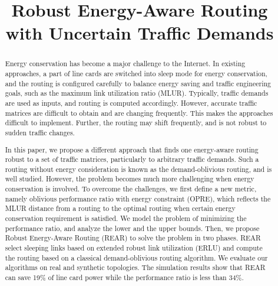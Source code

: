 \documentclass[conference]{IEEEtran}
\begin{document}
\title{Robust Energy-Aware Routing with Uncertain Traffic Demands}


\author{
\and
{}
\and
{}
}


\maketitle

\begin{abstract}
Energy conservation has become a major challenge to the Internet. In existing approaches, a part of line cards
are switched into sleep mode for energy conservation, and the routing is configured carefully to balance energy saving
and traffic engineering goals, such as the maximum link utilization ratio (MLUR). Typically, traffic demands are
used as inputs, and routing is computed accordingly. However, accurate traffic matrices are difficult to obtain and
are changing frequently. This makes the approaches difficult to implement. Further, the routing may shift
frequently, and is not robust to sudden traffic changes.

In this paper, we propose a different approach that finds one energy-aware routing robust to a set of traffic
matrices, particularly to arbitrary traffic demands. Such a routing without energy consideration is known as
the demand-oblivious routing, and is well studied. However, the problem becomes much more challenging when energy
conservation is involved. To overcome the challenges, we first define a new metric, namely oblivious performance
ratio with energy constraint (OPRE), which reflects the MLUR distance from a routing to the optimal routing when
certain energy conservation requirement is satisfied. We model the problem of minimizing the performance ratio,
and analyze the lower and the upper bounds. Then, we propose Robust Energy-Aware Routing (REAR) to solve
the problem in two phases. REAR select sleeping links based on extended robust link utilization (ERLU)
and compute the routing based on a classical demand-oblivious routing algorithm.
We evaluate our algorithms on real and synthetic topologies. The simulation results show that REAR can save
19\% of line card power while the performance ratio is less than 34\%.
\end{abstract}
\end{document}
